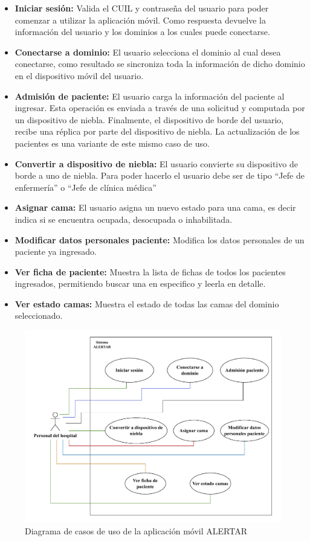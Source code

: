 \begin{itemize}
    \item \textbf{Iniciar sesión: }Valida el CUIL y contraseña del usuario para poder comenzar a utilizar la aplicación móvil. Como respuesta devuelve la información del usuario y los dominios a los cuales puede conectarse.
    \item \textbf{Conectarse a dominio:} El usuario selecciona el dominio al cual desea conectarse, como resultado se sincroniza toda la información de dicho dominio en el dispositivo móvil del usuario.
    \item \textbf{Admisión de paciente:} El usuario carga la información del paciente al ingresar. Esta operación es enviada a través de una solicitud y computada por un dispositivo de niebla. Finalmente, el dispositivo de borde del usuario, recibe una réplica por parte del dispositivo de niebla. La actualización de los pacientes es una variante de este mismo caso de uso.
    \item \textbf{Convertir a dispositivo de niebla:} El usuario convierte su dispositivo de borde a uno de niebla. Para poder hacerlo el usuario debe ser de tipo ``Jefe de enfermería'' o ``Jefe de clínica médica''
    \item \textbf{Asignar cama: }El usuario asigna un nuevo estado para una cama, es decir indica si se encuentra ocupada, desocupada o inhabilitada.
    \item \textbf{Modificar datos personales paciente: }Modifica los datos personales de un paciente ya ingresado.
    \item \textbf{Ver ficha de paciente: }Muestra la lista de fichas de todos los pacientes ingresados, permitiendo buscar una en especifico y leerla en detalle. 
    \item \textbf{Ver estado camas: }Muestra el estado de todas las camas del dominio seleccionado.
\end{itemize}

\begin{figure}
    \centering
    \includegraphics[width=\textwidth,keepaspectratio]{Imagenes/Implementacion/CasosDeUso.pdf}
    \caption{Diagrama de casos de uso de la aplicación móvil ALERTAR}
    \label{fig:diagCasosUso}
\end{figure}


